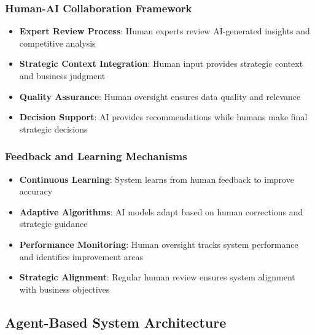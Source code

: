 \subsubsection{Human-AI Collaboration Framework}
\begin{itemize}
    \item \textbf{Expert Review Process}: Human experts review AI-generated insights and competitive analysis
    \item \textbf{Strategic Context Integration}: Human input provides strategic context and business judgment
    \item \textbf{Quality Assurance}: Human oversight ensures data quality and relevance
    \item \textbf{Decision Support}: AI provides recommendations while humans make final strategic decisions
\end{itemize}

\subsubsection{Feedback and Learning Mechanisms}
\begin{itemize}
    \item \textbf{Continuous Learning}: System learns from human feedback to improve accuracy
    \item \textbf{Adaptive Algorithms}: AI models adapt based on human corrections and strategic guidance
    \item \textbf{Performance Monitoring}: Human oversight tracks system performance and identifies improvement areas
    \item \textbf{Strategic Alignment}: Regular human review ensures system alignment with business objectives
\end{itemize}

\subsection{Agent-Based System Architecture}

